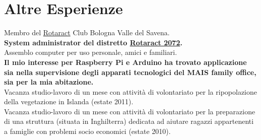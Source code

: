 \documentclass[%
               doublesided,
               paper=a4,
               fontsize=10pt
              ]{Rubini-Mattia-resume}
\begin{document}
    
    



\pagestyle{empty}

    \section{Altre Esperienze}
        Membro del \href{https://en.wikipedia.org/wiki/Rotaract}{Rotaract} Club Bologna Valle del Savena.
        \\\textbf{System administrator del distretto \href{https://rotaract2072.com/}{Rotaract 2072}.}
        \\Assemblo computer per uso personale, amici e familiari.
        \\ \textbf{Il mio interesse per Raspberry Pi e Arduino ha trovato applicazione sia nella supervisione degli apparati tecnologici del MAIS family office, sia per la mia abitazione.}
        \\Vacanza studio-lavoro di un mese con attività di volontariato per la ripopolazione della vegetazione in Islanda (estate 2011).
        \\Vacanza studio-lavoro di un mese con attività di volontariato per la preparazione di una struttura (situata in Inghilterra) dedicata ad aiutare ragazzi appartenenti a famiglie con problemi socio economici (estate 2010).



\end{document}
